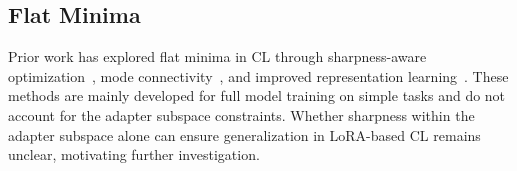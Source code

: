 \documentclass{article}
\theoremstyle{plain}
\theoremstyle{definition}
\theoremstyle{remark}
\begin{document}
\subsection{Flat Minima}
Prior work has explored flat minima in CL through sharpness-aware optimization~\cite{pmlr-v151-bisla22a,foretSharpnessAwareMinimizationEfficiently2021,zhangGradientNormAware2023}, mode connectivity~\cite{izmailov2019averagingweightsleadswider,mirzadeh2020linearmodeconnectivitymultitask}, and improved representation learning~\cite{hu2022doesselfsupervisedpretrainingperform,ramasesh2022effect}.
These methods are mainly developed for full model training on simple tasks and do not account for the adapter subspace constraints\cite{yangRevisitingFlatnessAwareOptimization2025}. Whether sharpness within the adapter subspace alone can ensure generalization in LoRA-based CL remains unclear, motivating further investigation.




\end{document}
